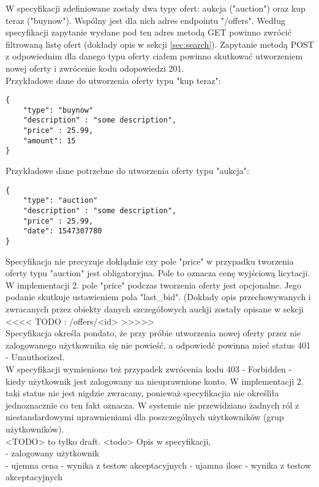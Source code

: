 \documentclass[12pt, notitlepage]{article}
\begin{document}
W specyfikacji zdefiniowane zostały dwa typy ofert: aukcja ("auction") oraz kup teraz ("buynow"). Wspólny jest dla nich adres endpointu "/offers". Według specyfikacji zapytanie wysłane pod ten adres metodą GET powinno zwrócić filtrowaną listę ofert (dokłady opis w sekcji \ref{sec:search}). Zapytanie metodą POST z odpowiednim dla danego typu oferty ciałem powinno skutkować utworzeniem nowej oferty i zwrócenie kodu odopowiedzi 201. \\

Przykładowe dane do utworzenia oferty typu "kup teraz":
\begin{lstlisting}
{     
    "type": "buynow"
    "description" : "some description",
    "price" : 25.99,
    "amount": 15
}
\end{lstlisting}

Przykładowe dane potrzebne do utworzenia oferty typu "aukcja":
\begin{lstlisting}
{     
    "type": "auction"
    "description" : "some description",
    "price" : 25.99,
    "date": 1547307780
}
\end{lstlisting}

Specyfikacja nie precyzuje dokłądnie czy pole "price" w przypadku tworzenia oferty typu "auction" jest obligatoryjna. Pole to oznacza cenę wyjściową licytacji. 
W implementacji 2. pole "price" podczas tworzenia oferty jest opcjonalne. Jego podanie skutkuje ustawieniem pola "last\_bid". (Dokłady opis przechowywanych i zwracanych przez obiekty danych szczegółowych auckji zostały opisane w sekcji <<<< TODO : /offers/<id> >>>>> \\

Specyfikacja określa pondato, że przy próbie utworzenia nowej oferty przez nie zalogowanego użytkownika się nie powieść, a odpowiedć powinna mieć status 401 - Unauthorized. \\
W specyfikacji wymieniono też przypadek zwrócenia kodu 403 - Forbidden - kiedy użytkownik jest zalogowany na nieuprawnione konto. W implementacji 2. taki status nie jest nigdzie zwracany, ponieważ specyfikacjia nie określiła jednoznacznie co ten fakt oznacza. W systemie nie przewidziano żadnych ról z niestandardowymi uprawnieniami dla poszczególnych użytkowników (grup użytkowników). \\


<TODO> to tylko draft. <todo>
Opis w specyfikacji, \\
- zalogowany użytkownik \\
- ujemna cena - wynika z testow akceptacyjnych
- ujamna ilosc - wynika z testow akceptacyjnych
\end{document}
